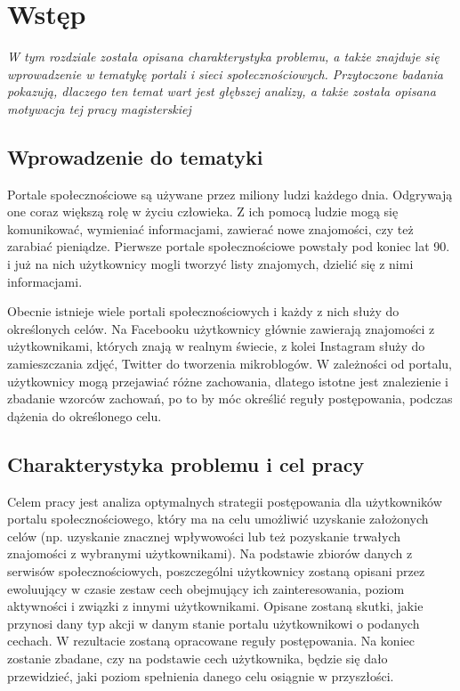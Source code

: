 \documentclass[polish,12pt]{aghthesis}
\begin{document}


\newpage
\tableofcontents

\newpage
\section{Wstęp}
\emph{W tym rozdziale została opisana charakterystyka problemu, a także znajduje się wprowadzenie w tematykę portali i sieci społecznościowych. Przytoczone badania pokazują, dlaczego ten temat wart jest głębszej analizy, a także została opisana motywacja tej pracy magisterskiej}

\subsection{Wprowadzenie do tematyki}
Portale społecznościowe są używane przez miliony ludzi każdego dnia. Odgrywają one coraz większą rolę w życiu człowieka. Z ich pomocą ludzie mogą się komunikować, wymieniać informacjami, zawierać nowe znajomości, czy też zarabiać pieniądze. Pierwsze portale społecznościowe powstały pod koniec lat 90. i już na nich użytkownicy mogli tworzyć listy znajomych, dzielić się z nimi informacjami.

Obecnie istnieje wiele portali społecznościowych i każdy z nich służy do określonych celów. Na Facebooku użytkownicy głównie zawierają znajomości z użytkownikami, których znają w realnym świecie, z kolei Instagram służy do zamieszczania zdjęć, Twitter do tworzenia mikroblogów. W zależności od portalu, użytkownicy mogą przejawiać różne zachowania, dlatego istotne jest znalezienie i zbadanie wzorców zachowań, po to by móc określić reguły postępowania, podczas dążenia do określonego celu.

\subsection{Charakterystyka problemu i cel pracy}
Celem pracy jest analiza optymalnych strategii postępowania dla użytkowników portalu społecznościowego, który ma na celu umożliwić uzyskanie założonych celów (np. uzyskanie znacznej wpływowości lub też pozyskanie trwałych znajomości z wybranymi użytkownikami). Na podstawie zbiorów danych z serwisów społecznościowych, poszczególni użytkownicy zostaną opisani przez ewoluujący w czasie zestaw cech obejmujący ich zainteresowania, poziom aktywności i związki z innymi użytkownikami. Opisane zostaną skutki, jakie przynosi dany typ akcji w danym stanie portalu użytkownikowi o podanych cechach. W rezultacie zostaną opracowane reguły postępowania. Na koniec zostanie zbadane, czy na podstawie cech użytkownika, będzie się dało przewidzieć, jaki poziom spełnienia danego celu osiągnie w przyszłości.
\end{document}

